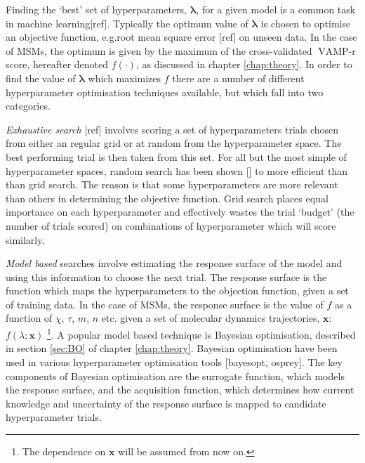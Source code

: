 Finding the `best' set of hyperparameters, $\mathbf{\lambda}$, for a given model is a common task in machine learning[ref]. Typically the optimum value of $\mathbf{\lambda}$ is chosen to optimise an objective function, e.g.root mean square error [ref] on unseen data. In the case of MSMs, the optimum is given by the maximum of the cross-validated $\operatorname{VAMP-r}$ score, hereafter denoted $f(\cdot)$, as discussed in chapter \ref{chap:theory}. In order to find the value of $\mathbf{\lambda}$ which maximizes $f$ there are a number of different hyperparameter optimisation techniques available, but which fall into two categories. 

\emph{Exhaustive search} [ref] involves scoring a set of  hyperparameters trials chosen from either an regular grid or at random from the hyperparameter space. The best performing trial is then taken from this set. For all but the most simple of hyperparameter spaces, random search has been shown [] to more efficient than  than grid search. The reason is that some hyperparameters are more relevant than others in determining the objective function. Grid search places equal importance on each hyperparameter and effectively wastes the trial `budget' (the number of trials scored) on combinations of hyperparameter which will score similarly. 

\emph{Model based} searches involve estimating the response surface of the model and using this information to choose the next trial. The response surface is the function which maps the hyperparameters to the objection function, given a set of training data. In the case of MSMs, the response surface is the value of $f$ as a function of $\chi$, $\tau$, $m$, $n$ etc. given a set of molecular dynamics trajectories, $\mathbf{x}$: $f(\lambda; \mathbf{x})$ \footnote{The dependence on $\mathbf{x}$ will be assumed from now on. }. A popular model based technique is Bayesian optimisation, described in section \ref{sec:BO} of chapter \ref{chap:theory}. Bayesian optimisation have been used in various hyperparameter optimisation tools [bayesopt, osprey].  The key components of Bayesian optimisation are the surrogate function, which models the response surface, and the acquisition function, which determines how current knowledge and uncertainty of the response surface is mapped to candidate hyperparameter trials. 

